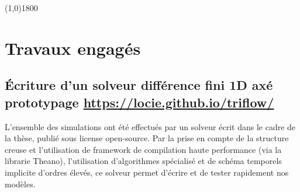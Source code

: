 \documentclass[a0,portrait]{a0poster}
\begin{document}
\begin{center}
    \line(1,0){1800}
\end{center}

\section*{Travaux engagés}
\subsection*{Écriture d'un solveur différence fini 1D axé prototypage \url{https://locie.github.io/triflow/}}
    L'ensemble des simulations ont été effectués par un solveur écrit dans le cadre de la thèse, publié sous license open-source. Par la prise en compte de la structure creuse et l'utilisation de framework de compilation haute performance (via la librarie Theano), l'utilisation d'algorithmes spécialisé et de schéma temporels implicite d'ordres élevés, ce solveur permet d'écrire et de tester rapidement nos modèles.
\end{document}
